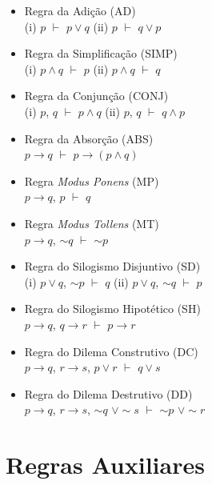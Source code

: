 \documentclass[12pt,a4paper,oneside]{article}
\begin{document}
\begin{itemize}
	\item Regra da Adição (AD) \\
	(i) $p$ $\vdash$ $p\vee q$ \hspace*{0.5cm} (ii) $p$ $\vdash$ $q \vee p$
	\item Regra da Simplificação (SIMP) \\
	(i) $p \wedge q$ $\vdash$ $p$ \hspace*{0.5cm} (ii) $p \wedge q$ $\vdash$ $q$
	\item Regra da Conjunção (CONJ) \\
	(i) $p$, $q$ $\vdash$ $p \wedge q$ \hspace*{0.5cm} (ii) $p$, $q$ $\vdash$ $q \wedge p$
	\item Regra da Absorção (ABS) \\
	$p \rightarrow q$ $\vdash$ $p \rightarrow (p \wedge q)$
	\item Regra {\it Modus Ponens} (MP) \\
	$p \rightarrow q$, $p$ $\vdash$ $q$
	\item Regra {\it Modus Tollens} (MT) \\
	$p \rightarrow q$, $\sim q$ $\vdash$ $\sim p$
	\item Regra do Silogismo Disjuntivo (SD) \\
	(i) $p \vee q$, $\sim p$ $\vdash$ $q$ \hspace*{0.5cm} (ii) $p \vee q$, $\sim q$ $\vdash$ $p$
	\item Regra do Silogismo Hipotético (SH) \\
	$p \rightarrow q$, $q \rightarrow r$ $\vdash$ $p \rightarrow r$
	\item Regra do Dilema Construtivo (DC) \\
	$p \rightarrow q$, $r \rightarrow s$, $p \vee r$ $\vdash$ $q \vee s$
	\item Regra do Dilema Destrutivo (DD) \\
	$p \rightarrow q$, $r \rightarrow s$, $\sim q$ $\vee \sim s$ $\vdash$ $\sim p$ $\vee \sim r$
\end{itemize}

\section*{Regras Auxiliares}
\end{document}
